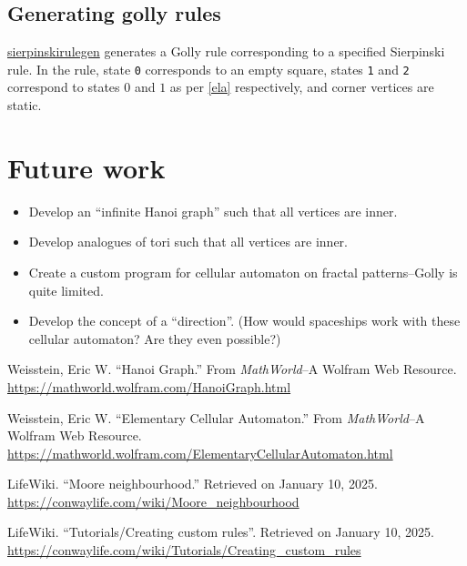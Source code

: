 \documentclass[12pt]{article}
\begin{document}
\subsection{Generating golly rules}
\href{https://github.com/GeethanPfeifer/sierpinski/blob/main/golly/sierpinskirulegen.cpp}{sierpinskirulegen} generates a Golly rule corresponding to a specified Sierpinski rule. In the rule, state \texttt{0} corresponds to an empty square, states \texttt{1} and \texttt{2} correspond to states $0$ and $1$ as per \ref{ela} respectively, and corner vertices are static.

\section{Future work}
\begin{itemize}
	\item Develop an ``infinite Hanoi graph'' such that all vertices are inner.
	\item Develop analogues of tori such that all vertices are inner.
	\item Create a custom program for cellular automaton on fractal patterns--Golly is quite limited.
	\item Develop the concept of a ``direction''. (How would spaceships work with these cellular automaton? Are they even possible?)

	
\end{itemize}\pagebreak
\begin{thebibliography}{9}
	Weisstein, Eric W. ``Hanoi Graph.'' From \textit{MathWorld}--A Wolfram Web Resource.\\ \url{https://mathworld.wolfram.com/HanoiGraph.html}
	
	Weisstein, Eric W. ``Elementary Cellular Automaton.'' From \textit{MathWorld}--A Wolfram Web Resource. \\\url{https://mathworld.wolfram.com/ElementaryCellularAutomaton.html}
	
	LifeWiki. ``Moore neighbourhood.'' Retrieved on January 10, 2025.\\ \url{https://conwaylife.com/wiki/Moore_neighbourhood}
	
	LifeWiki. ``Tutorials/Creating custom rules''. Retrieved on January 10, 2025.\\
	\url{https://conwaylife.com/wiki/Tutorials/Creating_custom_rules}
\end{thebibliography}
\end{document}
